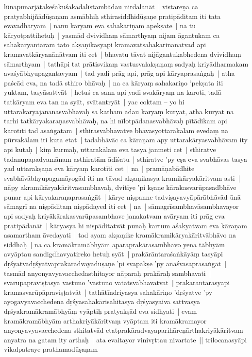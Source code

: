 \documentclass[article,a4paper]{memoir}
\newcommand{\persName}[1]{#1}
\begin{document}
lū\-napunarjā\-takeśakuśakadalī\-stambā\-dau nirdalanā\-t | vistareṇa ca pratyabhijñā\-dū\-ṣaṇam asmā\-bhiḥ sthirasiddhidū\-ṣaṇe pratipā\-ditam iti tata evā\-vadhā\-ryam | \label{thakur75-90.17} nanu kā\-ryam eva sahakā\-riṇam apekṣate | na tu kā\-ryotpattihetuḥ | yasmā\-d dvividhaṃ sā\-marthyaṃ nijam ā\-gantukaṃ ca sahakā\-ryantaram tato akṣaṇikasyā\-pi kramavatsahakā\-rinā\-nā\-tvā\-d api kramavatkā\-ryanā\-nā\-tvam iti cet | \label{thakur75-90.19} bhavatu tā\-vat nijā\-gantukabhedena dvividhaṃ sā\-marthyam | tathā\-pi tat prā\-tisvikaṃ vastusvalakṣaṇaṃ sadyaḥ kriyā\-dharmakam avaśyā\-bhyupagantavyam | tad yadi prā\-g api, prā\-g api kā\-ryaprasaṅgaḥ | atha paścā\-d eva, na tadā\- sthiro bhā\-vaḥ | \label{thakur75-90.23} na ca kā\-ryaṃ sahakariṇo 'pekṣata iti yuktam, tasyā\-sattvā\-t | hetuś ca sann api yadi svakā\-ryaṃ na karoti, tadā\- tatkā\-ryam eva tan na syā\-t, svā\-tantryā\-t | \label{thakur75-90.25} yac coktam – yo hi uttarakā\-ryajananasvabhā\-vaḥ sa katham ā\-dau kā\-ryaṃ kuryā\-t, atha kuryā\-t na tarhi tatkā\-ryakaraṇasvabhā\-vaḥ, na hi nī\-lotpā\-danasvabhā\-vaḥ pī\-tā\-dikam api karotī\-ti tad asaṅgatam | sthirasvabhā\-vatve bhā\-vasyottarakā\-lam evedaṃ na pū\-rvakā\-lam iti kuta etat | tadabhā\-vā\-c ca kā\-raṇam apy uttarakā\-ryasvabhā\-vam ity api kutaḥ | \label{thakur75-90.29} kiṃ kurmaḥ, uttarakā\-lam eva tasya janmeti cet | sthiratve tadanupapadyamā\-nam asthiratā\-m ā\-diśatu | sthiratve 'py eṣa eva svabhā\-vas tasya yad uttarakṣaṇa eva kā\-ryaṃ karotī\-ti cet | na | pramā\-ṇabā\-dhite svabhā\-vā\-bhyupagamā\-yogā\-d iti na tā\-vad akṣaṇikasya kramikā\-ryakā\-ritvam asti | nā\-py akramikā\-ryakā\-ritvasambhavaḥ, dvitī\-ye 'pi kṣaṇe kā\-rakasvarū\-pasadbhā\-ve punar api kā\-ryakaraṇaprasaṅgā\-t | \label{thakur75-91.4} kā\-rye niṣpanne tadviṣayavyā\-pā\-rā\-bhā\-vā\-d ū\-nā\- sā\-magrī\- na niṣpā\-ditaṃ niṣpā\-dayed iti cet | na | sā\-magrī\-sambhavā\-sambhavayor api sadyaḥ kriyā\-kā\-rakasvarū\-pasambhave janakatvam avā\-ryam iti prā\-g eva pratipā\-danā\-t | kā\-ryasya hi niṣpā\-ditatvā\-t punaḥ kartum aśakyatvam eva kā\-raṇam asamartham ā\-vedayati | \label{thakur75-91.7} tad ayam akṣaṇike kramā\-kramikā\-ryakā\-ritvā\-bhā\-vo na siddhaḥ | na ca kramā\-kramā\-bhyā\-m aparaprakā\-rasambhavo yena tā\-bhyā\-m avyā\-ptau sandigdhavyatireko hetuḥ syā\-t | prakā\-rā\-ntaraśaṅkā\-yā\-ṃ tasyā\-pi dṛśyatvā\-dṛśyatvaprakā\-radvayadū\-ṣaṇe 'pi svapakṣe 'py anā\-śvā\-saprasaṅgā\-t | tasmā\-d anyonyavyavacchedasthitayor nā\-paraḥ prakā\-raḥ sambhavati | svarū\-pā\-praviṣṭasya vastuno 'vastuno vā\-tatsvabhā\-vatvā\-t | prakā\-rā\-ntarasyā\-pi kramasvarū\-pā\-praviṣṭatvā\-t | tathā\-tī\-ndriyasya sahakā\-riṇo 'dṛśyatve 'py ayogavyavacchedena dṛśyasahakā\-risahitasya dṛśyasyaiva sattvasya dṛśyakramā\-kramā\-bhyā\-ṃ vyā\-ptiḥ pratyakṣā\-d eva sidhyati | evaṃ kramā\-kramā\-bhyā\-m arthakriyā\-kā\-ritvaṃ vyā\-ptam iti kramā\-kramayor anyonyavyavacchedena sthitatvā\-d etatprakā\-radvayaparihā\-reṇā\-rthakriyā\-kā\-ritvam anyatra na gatam ity arthaḥ | ata evaitayor vinivṛttau nivartate || \label{thakur75-91.17} \persName{trilocanasyā\-}pi vikalpatraye prathamadū\-ṣaṇam 
\end{document}
